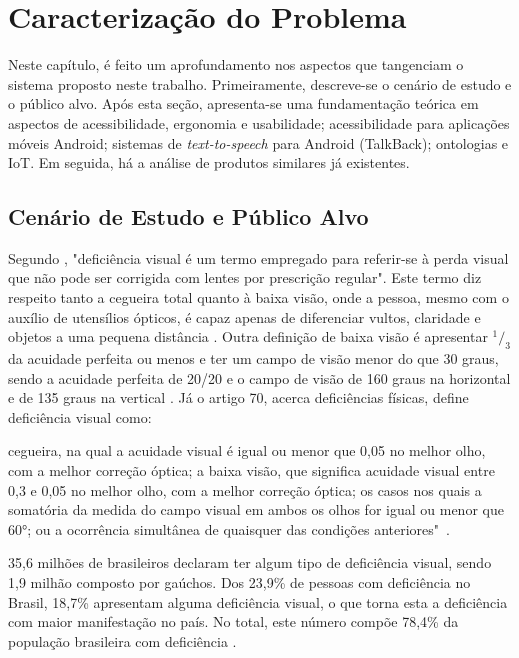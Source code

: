 \chapter{\label{chap:caract}Caracterização do Problema}

Neste capítulo, é feito um aprofundamento nos aspectos que tangenciam o sistema proposto neste trabalho. Primeiramente, descreve-se o cenário de estudo e o público alvo. Após esta seção, apresenta-se uma fundamentação teórica em aspectos de acessibilidade, ergonomia e usabilidade; acessibilidade para aplicações móveis Android; sistemas de \emph{text-to-speech} para Android (TalkBack); ontologias e IoT. Em seguida, há a análise de produtos similares já existentes.

\section{Cenário de Estudo e Público Alvo}

Segundo \cite{MOURA2006}, "deficiência visual é um termo empregado para referir-se à perda visual que não pode ser corrigida com lentes por prescrição regular". Este termo diz respeito tanto a cegueira total quanto à baixa visão, onde a pessoa, mesmo com o auxílio de utensílios ópticos, é capaz apenas de diferenciar vultos, claridade e objetos a uma pequena distância \cite{TVESCOLA}. Outra definição de baixa visão é apresentar $^1/_3$ da acuidade perfeita ou menos e ter um campo de visão menor do que 30 graus, sendo a acuidade perfeita de 20/20 e o campo de visão de 160 graus na horizontal e de 135 graus na vertical \cite{ERGO2015}. Já o artigo 70, acerca deficiências físicas, define deficiência visual como:
\begin{directcite}
	cegueira, na qual a acuidade visual é igual ou menor que 0,05 no melhor olho, com a melhor correção óptica; a baixa visão, que significa acuidade visual entre 0,3 e 0,05 no melhor olho, com a melhor correção óptica; os casos nos quais a somatória da medida do campo visual em ambos os olhos for igual ou menor que 60°; ou a ocorrência simultânea de quaisquer das condições anteriores"\ \cite{D5296}.
\end{directcite}

35,6 milhões de brasileiros declaram ter algum tipo de deficiência visual, sendo 1,9 milhão composto por gaúchos. Dos 23,9\% de pessoas com deficiência no Brasil, 18,7\% apresentam alguma deficiência visual, o que torna esta a deficiência com maior manifestação no país. No total, este número compõe 78,4\% da população brasileira com deficiência \cite{IBGE2010}.

